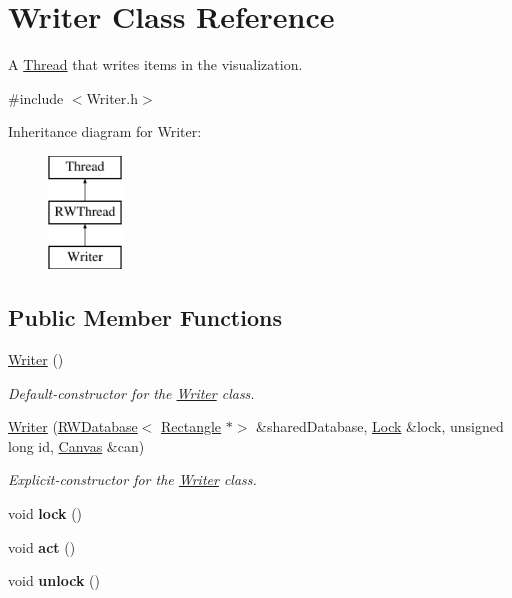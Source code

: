 \hypertarget{class_writer}{}\section{Writer Class Reference}
\label{class_writer}


A \hyperlink{class_thread}{Thread} that writes items in the visualization.  




{\ttfamily \#include $<$Writer.\+h$>$}

Inheritance diagram for Writer\+:\begin{figure}[H]
\begin{center}
\leavevmode
\includegraphics[height=3.000000cm]{class_writer}
\end{center}
\end{figure}
\subsection*{Public Member Functions}
\begin{DoxyCompactItemize}
\item 
\hyperlink{class_writer_aedc04cd5fb7b4b99d3ad906fef2116ce}{Writer} ()
\begin{DoxyCompactList}\small\item\em Default-\/constructor for the \hyperlink{class_writer}{Writer} class. \end{DoxyCompactList}\item 
\hyperlink{class_writer_a53cf1f8d2b8bee756303a54a9b05c04d}{Writer} (\hyperlink{class_r_w_database}{R\+W\+Database}$<$ \hyperlink{classtsgl_1_1_rectangle}{Rectangle} $\ast$$>$ \&shared\+Database, \hyperlink{class_lock}{Lock} \&lock, unsigned long id, \hyperlink{classtsgl_1_1_canvas}{Canvas} \&can)
\begin{DoxyCompactList}\small\item\em Explicit-\/constructor for the \hyperlink{class_writer}{Writer} class. \end{DoxyCompactList}\item 
\mbox{\label{class_writer_a2095bf3c278d7bacc9ce9cc503319aa7}} 
void {\bfseries lock} ()
\item 
\mbox{\label{class_writer_ae4c7b4e66afefb312d9ee516ad4fe776}} 
void {\bfseries act} ()
\item 
\mbox{\label{class_writer_a2664d4ec9c64dff9acd3289cff666f9d}} 
void {\bfseries unlock} ()
\end{DoxyCompactItemize}
